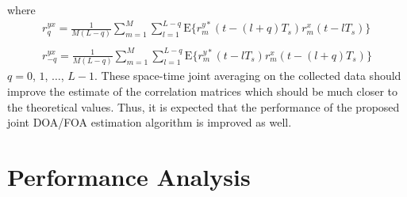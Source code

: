 \documentclass[a4paper,10pt,fleqn,twocolumn]{IEEEtran}
\begin{document}
\noindent where
\begin{equation}
\begin{array}{l}
r_q^{yx}=\frac{1}{M(L-q)}\sum\limits_{m=1}^{M}\sum\limits_{l=1}^{L-q}\mbox{E}\{r_m^{y\ast}(t-(l+q)T_s)r_m^x(t-lT_s)\}\\
\\
r_{-q}^{yx}=\frac{1}{M(L-q)}\sum\limits_{m=1}^{M}\sum\limits_{l=1}^{L-q}\mbox{E}\{r_m^{y\ast}(t-lT_s)r_m^x(t-(l+q)T_s)\}
\end{array}
\end{equation}
\noindent $q=0$, $1$, $\ldots$, $L-1$. These space-time joint
averaging on the collected data should improve the estimate of the
correlation matrices which should be much closer to the
theoretical values. Thus, it is expected that the performance of
the proposed joint DOA/FOA estimation algorithm is improved as
well.
\section{Performance Analysis}
\end{document}
